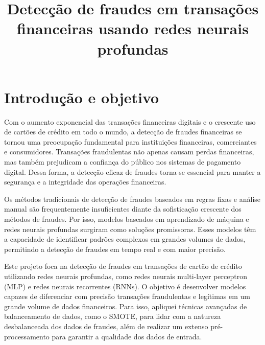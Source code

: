 \documentclass[conference]{IEEEtran}
\begin{document}
\title{Detecção de fraudes em transações financeiras usando redes neurais profundas\\
}

\author{
}

\maketitle

\section{Introdução e objetivo}

Com o aumento exponencial das transações financeiras digitais e o crescente uso de cartões de crédito em todo o mundo, a detecção de fraudes financeiras se tornou uma preocupação fundamental para instituições financeiras, comerciantes e consumidores. Transações fraudulentas não apenas causam perdas financeiras, mas também prejudicam a confiança do público nos sistemas de pagamento digital. Dessa forma, a detecção eficaz de fraudes torna-se essencial para manter a segurança e a integridade das operações financeiras.

Os métodos tradicionais de detecção de fraudes baseados em regras fixas e análise manual são frequentemente insuficientes diante da sofisticação crescente dos métodos de fraudes. Por isso, modelos baseados em aprendizado de máquina e redes neurais profundas surgiram como soluções promissoras. Esses modelos têm a capacidade de identificar padrões complexos em grandes volumes de dados, permitindo a detecção de fraudes em tempo real e com maior precisão.

Este projeto foca na detecção de fraudes em transações de cartão de crédito utilizando redes neurais profundas, como redes neurais multi-layer perceptron (MLP) e redes neurais recorrentes (RNNs). O objetivo é desenvolver modelos capazes de diferenciar com precisão transações fraudulentas e legítimas em um grande volume de dados financeiros. Para isso, apliquei técnicas avançadas de balanceamento de dados, como o SMOTE, para lidar com a natureza desbalanceada dos dados de fraudes, além de realizar um extenso pré-processamento para garantir a qualidade dos dados de entrada.
\end{document}
